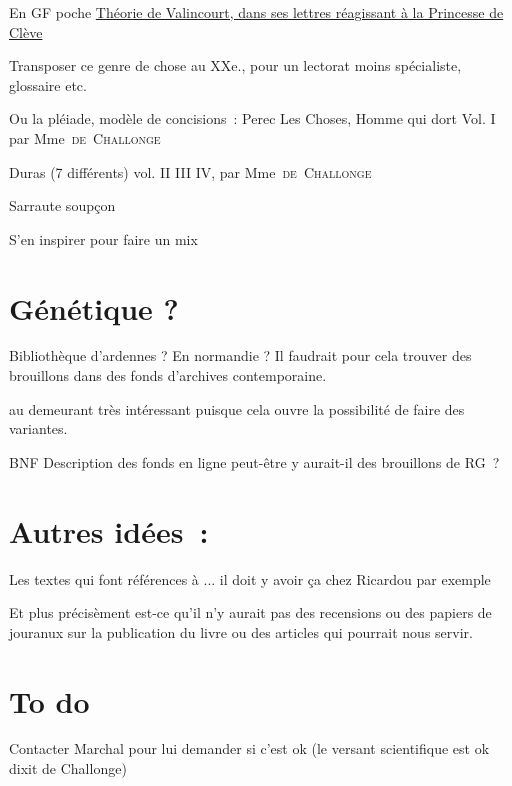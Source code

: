 \documentclass[12pt, a4paper]{article}
\begin{document}
En GF poche \href{https://www.lalibrairie.com/livres/lettres-a-madame-la-marquise-sur-le-sujet-de-la-princesse-de-cleves_0-60674_9782080711144.html}{Théorie de Valincourt, dans ses lettres réagissant à la Princesse de Clève}

Transposer ce genre de chose au XXe., pour un lectorat moins spécialiste, glossaire etc.

Ou la pléiade, modèle de concisions~:
Perec Les Choses, Homme qui dort Vol. I par Mme~\textsc{de~Challonge}

Duras (7 différents) vol. II III IV, par Mme~\textsc{de~Challonge}

Sarraute soupçon

S'en inspirer pour faire un mix 
\section{Génétique ?}
Bibliothèque d'ardennes ? En normandie ?
Il faudrait pour cela  trouver des brouillons dans des fonds d'archives contemporaine. 

au demeurant très intéressant puisque cela ouvre la possibilité de faire des variantes.

BNF 
Description des fonds en ligne peut-être y aurait-il des brouillons de RG~?

\section{Autres idées~:}

Les textes qui font références à ... il doit y avoir ça chez Ricardou par exemple


Et plus précisèment est-ce qu'il n'y aurait pas des recensions ou des papiers de jouranux sur la publication du livre ou des articles qui pourrait nous servir.

\section{To do}
Contacter Marchal pour lui demander si c'est ok (le versant scientifique est ok dixit de Challonge) 
\end{document}

